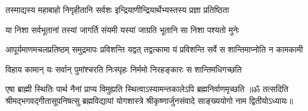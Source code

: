 \twolineshloka
{तस्माद्यस्य महाबाहो निगृहीतानि सर्वशः}
{इन्द्रियाणीन्द्रियार्थेभ्यस्तस्य प्रज्ञा प्रतिष्ठिता}%

\twolineshloka
{या निशा सर्वभूतानां तस्यां जागर्ति संयमी}
{यस्यां जाग्रति भूतानि सा निशा पश्यतो मुनेः}%

\fourlineindentedshloka
{आपूर्यमाणमचलप्रतिष्ठम्}
{समुद्रमापः प्रविशन्ति यद्वत्}
{तद्वत्कामा यं प्रविशन्ति सर्वे}
{स शान्तिमाप्नोति न कामकामी}%

\twolineshloka
{विहाय कामान् यः  सर्वान् पुमांश्चरति निःस्पृहः}
{निर्ममो निरहङ्कारः स शान्तिमधिगच्छति}%

\twolineshloka
{एषा ब्राह्मी स्थितिः पार्थ नैनां प्राप्य विमुह्यति}
{स्थित्वाऽस्यामन्तकालेऽपि ब्रह्मनिर्वाणमृच्छति}%
{॥ॐ तत्सदिति श्रीमद्भगवद्गीतासूपनिषत्सु ब्रह्मविद्यायां योगशास्त्रे श्रीकृष्णार्जुनसंवादे साङ्ख्ययोगो नाम द्वितीयोऽध्यायः॥}
